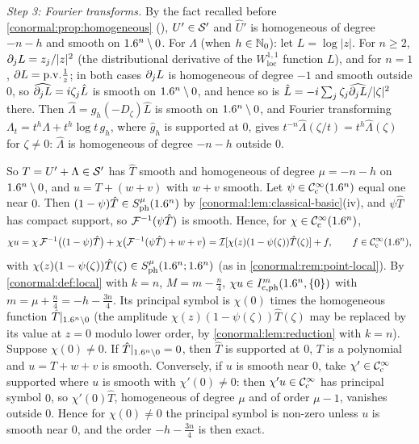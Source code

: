 \emph{Step 3: Fourier transforms.} By the fact recalled before
\cref{conormal:prop:homogeneous} (\cite[Theorem~7.1.18]{Hormander-I}), $U'\in\mathcal{S}'$ and
$\hat U'$ is homogeneous of degree $-n-h$ and smooth on $1.6^n\setminus0$. For $\Lambda$
(when $h\in\mathbb{N}_0$): let $L=\log|z|$. For $n\ge2$, $\partial_jL=z_j/|z|^2$ (the distributional
derivative of the $W^{1,1}_{\mathrm{loc}}$ function $L$), and for $n=1$, $\partial L=\mathrm{p.v.}
\frac1z$; in both cases $\partial_jL$ is homogeneous of degree $-1$ and smooth outside $0$, so
$\widehat{\partial_jL}=i\zeta_j\hat L$ is smooth on $1.6^n\setminus0$, and hence so is
$\hat L=-i\sum_j\zeta_j\widehat{\partial_jL}/|\zeta|^2$ there. Then $\hat\Lambda=g_h(-D_\zeta)\hat L$
is smooth on $1.6^n\setminus0$, and Fourier transforming
$\Lambda_t=t^h\Lambda+t^h\log t\,g_h$, where $\hat g_h$ is supported at $0$, gives
$t^{-n}\hat\Lambda(\zeta/t)=t^h\hat\Lambda(\zeta)$ for $\zeta\ne0$: $\hat\Lambda$ is homogeneous
of degree $-n-h$ outside $0$.

So $T=U'+\Lambda\in\mathcal{S}'$ has $\hat T$ smooth and homogeneous of degree $\mu=-n-h$ on
$1.6^n\setminus0$, and $u=T+(w+v)$ with $w+v$ smooth. Let $\psi\in\mathcal{C}^\infty_{\mathrm{c}}(1.6^n)$ equal one near
$0$. Then $(1-\psi)\hat T\in S^{\mu}_{\mathrm{ph}}(1.6^n)$ by \cref{conormal:lem:classical-basic}(iv), and
$\psi\hat T$ has compact support, so $\mathcal{F}^{-1}(\psi\hat T)$ is smooth. Hence, for
$\chi\in\mathcal{C}^\infty_{\mathrm{c}}(1.6^n)$,
\begin{equation*}
\chi u=\chi\,\mathcal{F}^{-1}\big((1-\psi)\hat T\big)+\chi\big(\mathcal{F}^{-1}(\psi\hat T)+w+v\big)
=\mathcal{I}[\chi(z)(1-\psi(\zeta))\hat T(\zeta)]+f,\qquad f\in\mathcal{C}^\infty_{\mathrm{c}}(1.6^n),
\end{equation*}
with $\chi(z)(1-\psi(\zeta))\hat T(\zeta)\in S^{\mu}_{\mathrm{ph}}(1.6^n;1.6^n)$ (as in
\cref{conormal:rem:point-local}). By \cref{conormal:def:local} with $k=n$, $M=m-\frac n4$,
$\chi u\in I^{m}_{\mathrm c,\mathrm{ph}}(1.6^n,\{0\})$ with $m=\mu+\frac n4=-h-\frac{3n}4$. Its
principal symbol is $\chi(0)$ times the homogeneous function $\hat T|_{1.6^n\setminus0}$ (the
amplitude $\chi(z)(1-\psi(\zeta))\hat T(\zeta)$ may be replaced by its value at $z=0$ modulo
lower order, by \cref{conormal:lem:reduction} with $k=n$). Suppose $\chi(0)\ne0$. If
$\hat T|_{1.6^n\setminus0}=0$, then $\hat T$ is supported at $0$, $T$ is a polynomial and
$u=T+w+v$ is smooth. Conversely, if $u$ is smooth near $0$, take $\chi'\in\mathcal{C}^\infty_{\mathrm{c}}$ supported
where $u$ is smooth with $\chi'(0)\ne0$: then $\chi'u\in\mathcal{C}^\infty_{\mathrm{c}}$ has principal symbol $0$, so
$\chi'(0)\hat T$, homogeneous of degree $\mu$ and of order $\mu-1$, vanishes outside $0$.
Hence for $\chi(0)\ne0$ the principal symbol is non-zero unless $u$ is smooth near $0$, and
the order $-h-\frac{3n}4$ is then exact.

